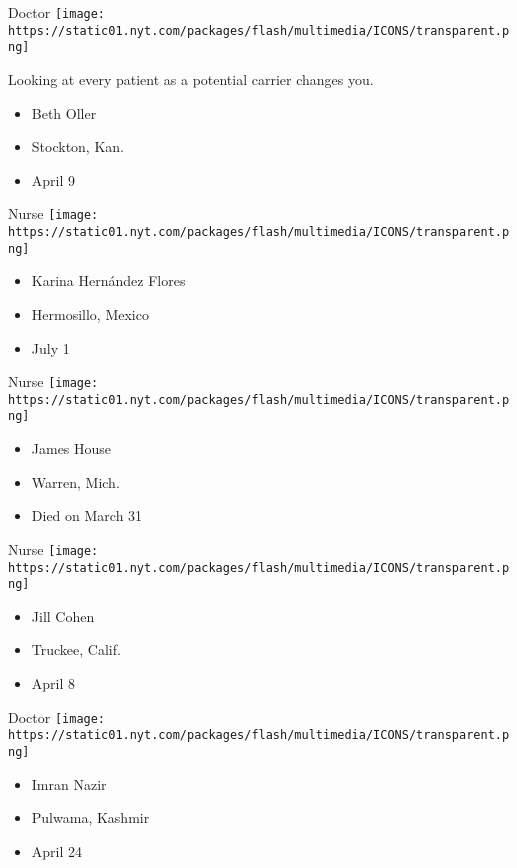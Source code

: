 \protect\hyperlink{item-beth-oller}{}

Doctor
\texttt{[image: https://static01.nyt.com/packages/flash/multimedia/ICONS/transparent.png]}

Looking at every patient as a potential carrier changes you.

\begin{itemize}
\tightlist
\item
  Beth Oller
\item
  Stockton, Kan.
\item
  April 9
\end{itemize}

\protect\hyperlink{item-karina-hernandez-flores}{}

Nurse
\texttt{[image: https://static01.nyt.com/packages/flash/multimedia/ICONS/transparent.png]}

\begin{itemize}
\tightlist
\item
  Karina Hernández Flores
\item
  Hermosillo, Mexico
\item
  July 1
\end{itemize}

\protect\hyperlink{item-james-house}{}

Nurse
\texttt{[image: https://static01.nyt.com/packages/flash/multimedia/ICONS/transparent.png]}

\begin{itemize}
\tightlist
\item
  James House
\item
  Warren, Mich.
\item
  Died on March 31
\end{itemize}

\protect\hyperlink{item-jill-cohen}{}

Nurse
\texttt{[image: https://static01.nyt.com/packages/flash/multimedia/ICONS/transparent.png]}

\begin{itemize}
\tightlist
\item
  Jill Cohen
\item
  Truckee, Calif.
\item
  April 8
\end{itemize}

\protect\hyperlink{item-imran-nazir}{}

Doctor
\texttt{[image: https://static01.nyt.com/packages/flash/multimedia/ICONS/transparent.png]}

\begin{itemize}
\tightlist
\item
  Imran Nazir
\item
  Pulwama, Kashmir
\item
  April 24
\end{itemize}

